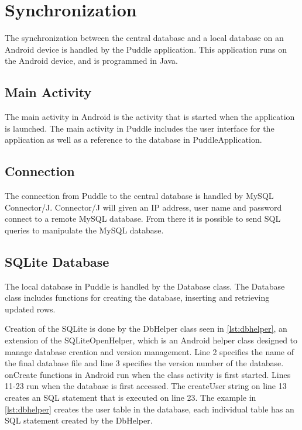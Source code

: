 \section{Synchronization}
The synchronization between the central database and a local database on an Android device is handled by the Puddle application. This application runs on the Android device, and is programmed in Java.

\subsection{Main Activity}
The main activity in Android is the activity that is started when the application is launched. The main activity in Puddle includes the user interface for the application as well as a reference to the database in PuddleApplication.

\subsection{Connection}
The connection from Puddle to the central database is handled by MySQL Connector/J. Connector/J will given an IP address, user name and password connect to a remote MySQL database. From there it is possible to send SQL queries to manipulate the MySQL database.

\subsection{SQLite Database}
The local database in Puddle is handled by the Database class. The Database class includes functions for creating the database, inserting and retrieving updated rows.

Creation of the SQLite is done by the DbHelper class seen in \autoref{lst:dbhelper}, an extension of the SQLiteOpenHelper, which is an Android helper class designed to manage database creation and version management. Line 2 specifies the name of the final database file and line 3 specifies the version number of the database.
onCreate functions in Android run when the class activity is first started. Lines 11-23 run when the database is first accessed. The createUser string on line 13 creates an SQL statement that is executed on line 23. The example in \autoref{lst:dbhelper} creates the user table in the database, each individual table has an SQL statement created by the DbHelper.



